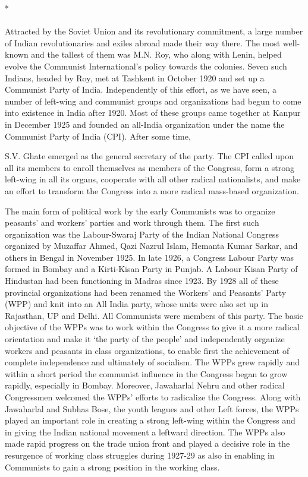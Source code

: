 \begin{center}*\end{center}

\paragraph*{}


Attracted by the Soviet Union and its revolutionary commitment, a large number of Indian revolutionaries and exiles abroad made their way there. The most well-known and the tallest of them was M.N. Roy, who along with Lenin, helped evolve the Communist International's policy towards the colonies. Seven such Indians, headed by Roy, met at Tashkent in October 1920 and set up a Communist Party of India. Independently of this effort, as we have seen, a number of left-wing and communist groups and organizations had begun to come into existence in India after 1920. Most of these groups came together at Kanpur in December 1925 and founded an all-India organization under the name the Communist Party of India (CPI). After some time, 

S.V. Ghate emerged as the general secretary of the party. The CPI called upon all its members to enroll themselves as members of the Congress, form a strong left-wing in all its organs, cooperate with all other radical nationalists, and make an effort to transform the Congress into a more radical mass-based organization. 

The main form of political work by the early Communists was to organize peasants' and workers' parties and work through them. The first such organization was the Labour-Swaraj Party of the Indian National Congress organized by Muzaffar Ahmed, Qazi Nazrul Islam, Hemanta Kumar Sarkar, and others in Bengal in November 1925. In late 1926, a Congress Labour Party was formed in Bombay and a Kirti-Kisan Party in Punjab. A Labour Kisan Party of Hindustan had been functioning in Madras since 1923. By 1928 all of these provincial organizations had been renamed the Workers' and Peasants' Party (WPP) and knit into an All India party, whose units were also set up in Rajasthan, UP and Delhi. All Communists were members of this party. The basic objective of the WPPs was to work within the Congress to give it a more radical orientation and make it `the party of the people' and independently organize workers and peasants in class organizations, to enable first the achievement of complete independence and ultimately of socialism. The WPPs grew rapidly and within a short period the communist influence in the Congress began to grow rapidly, especially in Bombay. Moreover, Jawaharlal Nehru and other radical Congressmen welcomed the WPPs' efforts to radicalize the Congress. Along with Jawaharlal and Subhas Bose, the youth leagues and other Left forces, the WPPs played an important role in creating a strong left-wing within the Congress and in giving the Indian national movement a leftward direction. The WPPs also made rapid progress on the trade union front and played a decisive role in the resurgence of working class struggles during 1927-29 as also in enabling in Communists to gain a strong position in the working class. 

